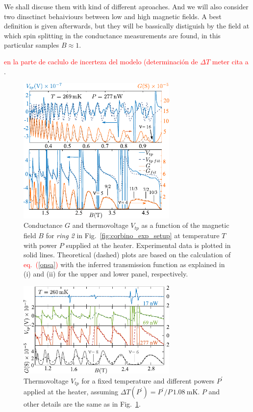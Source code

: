 We shall discuse them with kind of different aproaches. And we will also consider two dinsctinct behaiviours between low and high magnetic fields. A best definition is given afterwards, but they will be bassically distiguish by the field at which spin splitting in the conductance measurements are found,  in this particular samples $B \approx 1$.

\textcolor{red}{en la parte de caclulo de incerteza del modelo (determinación de $\Delta T$ meter cita a \cite{gum2008, gumModels}}.

\begin{figure}
    \includegraphics[width = 0.7\textwidth]{figures/vtpGmodel/termovoltageConductance/fig2.pdf}
    \caption{Conductance $G$ and thermovoltage $V_{tp}$ as a function of the magnetic field $B$ for \textit{ring 2} in Fig.~\ref{fig:corbino_exp_setup} at temperature $T$ with power $P$ supplied at the heater.
    Experimental data is plotted in solid lines. Theoretical (dashed) plots  are based on the calculation of 
    \textcolor{red}{eq.~(\ref{onsa})} 
    with the inferred transmission function as explained in (i) and (ii) for the upper and lower panel, respectively.  }
    \label{fig:lowHifield}
\end{figure}


\begin{figure}
    \includegraphics[width=0.7\textwidth]{figures/vtpGmodel/termovoltageConductance/fig3.pdf}
    \caption{Thermovoltage $V_{tp}$  for a fixed temperature and different powers $P^{\prime}$
    applied at the heater, assuming $\Delta T (P^{\prime}) = P^{\prime}/P \, \SI{1.08}{\milli\kelvin}$.
    $P$ and other details are the same as in  Fig.~\ref{fig:lowHifield}.}
    \label{fig:modelHeaterPower}
\end{figure}




